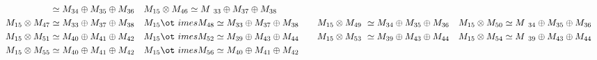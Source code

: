\begin{align*}
{} \simeq M_{34} \oplus M_{35} \oplus M_{36} &&& M_{15} \otimes M_{46} \simeq M\
_{33} \oplus M_{37} \oplus M_{38}\\
M_{15} \otimes M_{47} \simeq M_{33} \oplus M_{37} \oplus M_{38} &&& M_{15} \ot\
imes M_{48} \simeq M_{33} \oplus M_{37} \oplus M_{38} &&& M_{15} \otimes M_{49\
} \simeq M_{34} \oplus M_{35} \oplus M_{36} &&& M_{15} \otimes M_{50} \simeq M\
_{34} \oplus M_{35} \oplus M_{36}\\
M_{15} \otimes M_{51} \simeq M_{40} \oplus M_{41} \oplus M_{42} &&& M_{15} \ot\
imes M_{52} \simeq M_{39} \oplus M_{43} \oplus M_{44} &&& M_{15} \otimes M_{53\
} \simeq M_{39} \oplus M_{43} \oplus M_{44} &&& M_{15} \otimes M_{54} \simeq M\
_{39} \oplus M_{43} \oplus M_{44}\\
M_{15} \otimes M_{55} \simeq M_{40} \oplus M_{41} \oplus M_{42} &&& M_{15} \ot\
imes M_{56} \simeq M_{40} \oplus M_{41} \oplus M_{42}\\
\end{align*}

